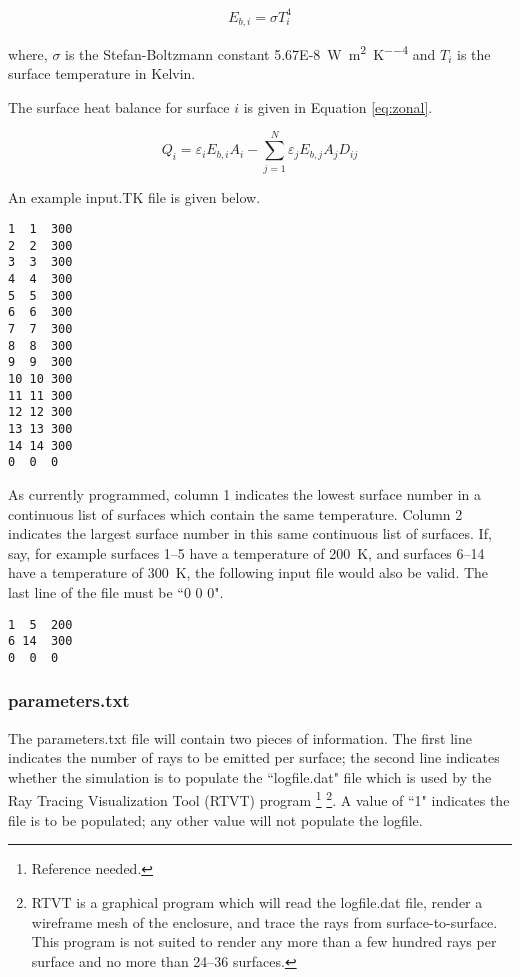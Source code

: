 \documentclass{article}
\begin{document}
\begin{equation}
    E_{b,i} = \sigma T_i^4
    \label{eq:bbpower}
\end{equation}

where, $\sigma$ is the Stefan-Boltzmann constant \SI{5.67E-8}{\watt\per\meter\squared\per\kelvin\tothe{4}} and $T_i$ is the surface temperature in Kelvin.

The surface heat balance for surface $i$ is given in Equation \ref{eq:zonal}.

\begin{equation}
    Q_i = \varepsilon_i E_{b,i} A_i - \sum_{j=1}^N \varepsilon_j E_{b,j} A_j D_{ij}
    \label{eq:zonal}
\end{equation}

An example input.TK file is given below.

\begin{lstlisting}
1  1  300
2  2  300
3  3  300
4  4  300
5  5  300
6  6  300
7  7  300
8  8  300
9  9  300
10 10 300
11 11 300
12 12 300
13 13 300
14 14 300
0  0  0
\end{lstlisting}

As currently programmed, column 1 indicates the lowest surface number in a continuous list of surfaces which contain the same temperature. Column 2 indicates the largest surface number in this same continuous list of surfaces. If, say, for example surfaces 1--5 have a temperature of \SI{200}{\kelvin}, and surfaces 6--14 have a temperature of \SI{300}{\kelvin}, the following input file would also be valid. The last line of the file must be ``0 0 0".

\begin{lstlisting}
1  5  200
6 14  300
0  0  0
\end{lstlisting}

\subsubsection{parameters.txt}

The parameters.txt file will contain two pieces of information. The first line indicates the number of rays to be emitted per surface; the second line indicates whether the simulation is to populate the ``logfile.dat" file which is used by the Ray Tracing Visualization Tool (RTVT) program \footnote{Reference needed.} \footnote{RTVT is a graphical program which will read the logfile.dat file, render a wireframe mesh of the enclosure, and trace the rays from surface-to-surface. This program is not suited to render any more than a few hundred rays per surface and no more than 24--36 surfaces.}. A value of ``1" indicates the file is to be populated; any other value will not populate the logfile.
\end{document}
